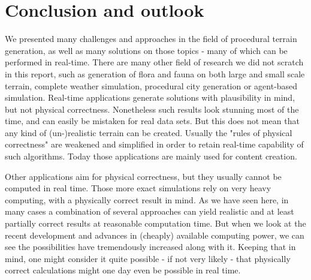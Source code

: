 \section{Conclusion and outlook}
We presented many challenges and approaches in the field of procedural terrain generation, as well as many solutions on those topics - many of which can be performed in real-time. There are many other field of research we did not scratch in this report, such as generation of flora and fauna on both large and small scale terrain, complete weather simulation, procedural city generation or agent-based simulation. Real-time applications generate solutions with plausibility in mind, but not physical correctness. Nonetheless such results look stunning most of the time, and can easily be mistaken for real data sets. But this does not mean that any kind of (un-)realistic terrain can be created. Usually the "rules of physical correctness" are weakened and simplified in order to retain real-time capability of such algorithms. Today those applications are mainly used for content creation.

Other applications aim for physical correctness, but they usually cannot be computed in real time. Those more exact simulations rely on very heavy computing, with a physically correct result in mind. As we have seen here, in many cases a combination of several approaches can yield realistic and at least partially correct results at reasonable computation time. But when we look at the recent development and advances in (cheaply) available computing power, we can see the possibilities have tremendously increased along with it. Keeping that in mind, one might consider it quite possible - if not very likely - that physically correct calculations might one day even be possible in real time.